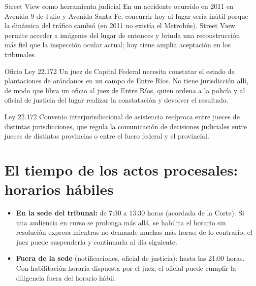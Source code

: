 \documentclass[12pt,oneside]{book}
\begin{document}
\begin{ejemplo}{Street View como herramienta judicial}
En un accidente ocurrido en 2011 en Avenida 9 de Julio y Avenida Santa Fe, concurrir hoy al lugar sería inútil porque la dinámica del tráfico cambió (en 2011 no existía el Metrobús). Street View permite acceder a imágenes del lugar de entonces y brinda una reconstrucción más fiel que la inspección ocular actual; hoy tiene amplia aceptación en los tribunales.
\end{ejemplo}

\begin{ejemplo}{Oficio Ley 22.172}
Un juez de Capital Federal necesita constatar el estado de plantaciones de arándanos en un campo de Entre Ríos. No tiene jurisdicción allí, de modo que libra un oficio al juez de Entre Ríos, quien ordena a la policía y al oficial de justicia del lugar realizar la constatación y devolver el resultado.
\end{ejemplo}

\begin{definicion}{Ley 22.172}
Convenio interjurisdiccional de asistencia recíproca entre jueces de distintas jurisdicciones, que regula la comunicación de decisiones judiciales entre jueces de distintas provincias o entre el fuero federal y el provincial.
\end{definicion}

\section{El tiempo de los actos procesales: horarios hábiles}

\begin{itemize}
\item \textbf{En la sede del tribunal:} de 7:30 a 13:30 horas (acordada de la Corte). Si una audiencia en curso se prolonga más allá, se habilita el horario sin resolución expresa mientras no demande muchas más horas; de lo contrario, el juez puede suspenderla y continuarla al día siguiente.
\item \textbf{Fuera de la sede} (notificaciones, oficial de justicia): hasta las 21:00 horas. Con habilitación horaria dispuesta por el juez, el oficial puede cumplir la diligencia fuera del horario hábil.
\end{itemize}
\end{document}

